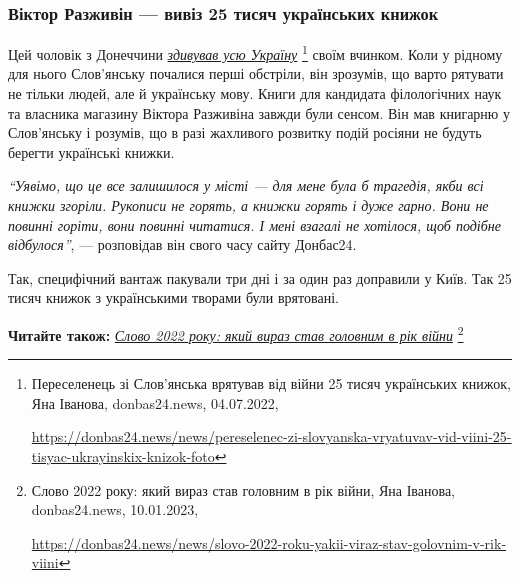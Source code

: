 

\subsubsection{Віктор Разживін — вивіз 25 тисяч українських книжок}

Цей чоловік з Донеччини \href{https://donbas24.news/news/pereselenec-zi-slovyanska-vryatuvav-vid-viini-25-tisyac-ukrayinskix-knizok-foto}{\emph{здивував усю Україну}}%
\footnote{Переселенець зі Слов'янська врятував від війни 25 тисяч українських книжок, Яна Іванова, donbas24.news, 04.07.2022, \par\url{https://donbas24.news/news/pereselenec-zi-slovyanska-vryatuvav-vid-viini-25-tisyac-ukrayinskix-knizok-foto}}
своїм вчинком. Коли у рідному для нього Слов'янську почалися перші обстріли, він зрозумів, що варто рятувати не
тільки людей, але й українську мову. Книги для кандидата філологічних наук та
власника магазину Віктора Разживіна завжди були сенсом. Він мав книгарню у
Слов'янську і розумів, що в разі жахливого розвитку подій росіяни не будуть
берегти українські книжки.

\begin{leftbar}
\emph{\enquote{Уявімо, що це все залишилося у місті — для мене була б трагедія, якби всі
книжки згоріли. Рукописи не горять, а книжки горять і дуже гарно. Вони не
повинні горіти, вони повинні читатися. І мені взагалі не хотілося, щоб подібне
відбулося}}, — розповідав він свого часу сайту Донбас24.
\end{leftbar}


Так, специфічний вантаж пакували три дні і за один раз доправили у Київ. Так 25
тисяч книжок з українськими творами були врятовані.

\textbf{Читайте також:} \href{https://donbas24.news/news/slovo-2022-roku-yakii-viraz-stav-golovnim-v-rik-viini}{\emph{Слово 2022 року: який вираз став головним в рік війни}}%
\footnote{Слово 2022 року: який вираз став головним в рік війни, Яна Іванова, donbas24.news, 10.01.2023, \par%
\url{https://donbas24.news/news/slovo-2022-roku-yakii-viraz-stav-golovnim-v-rik-viini}%
}


